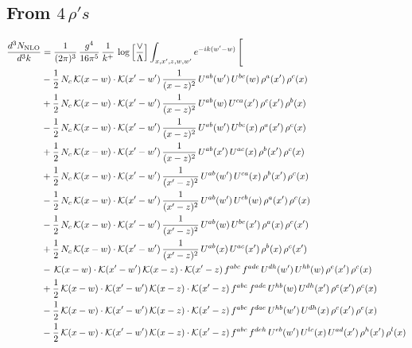 \documentclass[9pt]{article}
\numberwithin{equation}{section}
\begin{document}
\subsection{From $4\, \rho's$}
\begin{align}
\frac{d^{3}N_{\mathrm{NLO}}}{d^{3}k} & = \frac{1}{(2\pi)^{3}}\,\frac{g^{4}}{16\pi^{5}}\,\frac{1}{k^{+}}\,\log\Big[\frac{\vee}{\Lambda}\Big]\int_{x,x',z,w,w'}e^{-ik(w'-w)}\,\Bigg[\notag\\ & -\frac{1}{2}\,N_{c}\,\mathcal{K}(x-w)\cdot\mathcal{K}(x'-w')\,\frac{1}{(x-z)^{2}}\,U^{ab}(w')\,U^{bc}(w)\,\rho^{a}(x')\,\rho^{c}(x)\notag\\
& +\frac{1}{2}\,N_{c}\,\mathcal{K}(x-w)\cdot\mathcal{K}(x'-w')\,\frac{1}{(x-z)^{2}}\,U^{ab}(w)\,U^{ca}(x')\,\rho^{c}(x')\,\rho^{b}(x)\notag\\
& -\frac{1}{2}\,N_{c}\,\mathcal{K}(x-w)\cdot\mathcal{K}(x'-w')\,\frac{1}{(x-z)^{2}}\,U^{ab}(w')\,U^{bc}(x)\,\rho^{a}(x')\,\rho^{c}(x)\notag\\
& +\frac{1}{2}\,N_{c}\,\mathcal{K}(x-w)\cdot\mathcal{K}(x'-w')\,\frac{1}{(x-z)^{2}}\,U^{ab}(x')\,U^{ac}(x)\,\rho^{b}(x')\,\rho^{c}(x)\notag\\
& +\frac{1}{2}\,N_{c}\,\mathcal{K}(x-w)\cdot\mathcal{K}(x'-w')\,\frac{1}{(x'-z)^{2}}\,U^{ab}(w')\,U^{ca}(x)\,\rho^{b}(x')\,\rho^{c}(x)\notag\\
& -\frac{1}{2}\,N_{c}\,\mathcal{K}(x-w)\cdot\mathcal{K}(x'-w')\,\frac{1}{(x'-z)^{2}}\,U^{ab}(w')\,U^{cb}(w)\,\rho^{a}(x')\,\rho^{c}(x)\notag\\
& -\frac{1}{2}\,N_{c}\,\mathcal{K}(x-w)\cdot\mathcal{K}(x'-w')\,\frac{1}{(x'-z)^{2}}\,U^{ab}(w)\,U^{bc}(x')\,\rho^{a}(x)\,\rho^{c}(x')\notag\\
& +\frac{1}{2}\,N_{c}\,\mathcal{K}(x-w)\cdot\mathcal{K}(x'-w')\,\frac{1}{(x'-z)^{2}}\,U^{ab}(x)\,U^{ac}(x')\,\rho^{b}(x)\,\rho^{c}(x')\notag\\
& -\,\mathcal{K}(x-w)\cdot\mathcal{K}(x'-w')\,\mathcal{K}(x-z)\cdot\mathcal{K}(x'-z)\,f^{abc}\,f^{ade}\,U^{dh}(w')\,U^{hb}(w)\,\rho^{e}(x')\,\rho^{c}(x)\notag\\
& +\frac{1}{2}\,\mathcal{K}(x-w)\cdot\mathcal{K}(x'-w')\,\mathcal{K}(x-z)\cdot\mathcal{K}(x'-z)\,f^{abc}\,f^{ade}\,U^{hb}(w)\,U^{dh}(x')\,\rho^{e}(x')\,\rho^{c}(x)\notag\\
& -\frac{1}{2}\,\mathcal{K}(x-w)\cdot\mathcal{K}(x'-w')\,\mathcal{K}(x-z)\cdot\mathcal{K}(x'-z)\,f^{abc}\,f^{dae}\,U^{hb}(w')\,U^{dh}(x)\,\rho^{c}(x')\,\rho^{e}(x)\notag\\
& -\frac{1}{2}\,\mathcal{K}(x-w)\cdot\mathcal{K}(x'-w')\,\mathcal{K}(x-z)\cdot\mathcal{K}(x'-z)\,f^{abc}\,f^{deh}\,U^{eb}(w')\,U^{lc}(x)\,U^{ad}(x')\,\rho^{h}(x')\,\rho^{l}(x)\notag\\

\end{align}
\end{document}
